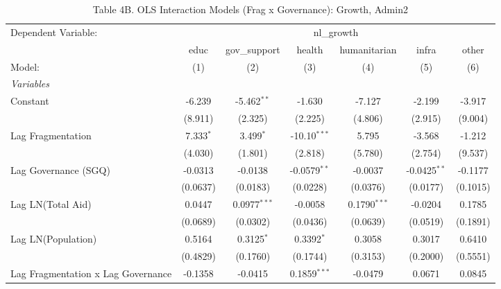 \begin{table}[H]
   \caption{Table 4B. OLS Interaction Models (Frag x Governance): Growth, Admin2}
   \centering
   \begin{tabular}{lcccccc}
      \tabularnewline \midrule \midrule
      Dependent Variable: & \multicolumn{6}{c}{nl\_growth}\\
                                         & educ        & gov\_support   & health         & humanitarian   & infra          & other \\   
      Model:                             & (1)         & (2)            & (3)            & (4)            & (5)            & (6)\\  
      \midrule
      \emph{Variables}\\
      Constant                           & -6.239      & -5.462$^{**}$  & -1.630         & -7.127         & -2.199         & -3.917\\   
                                         & (8.911)     & (2.325)        & (2.225)        & (4.806)        & (2.915)        & (9.004)\\   
      Lag Fragmentation                  & 7.333$^{*}$ & 3.499$^{*}$    & -10.10$^{***}$ & 5.795          & -3.568         & -1.212\\   
                                         & (4.030)     & (1.801)        & (2.818)        & (5.780)        & (2.754)        & (9.537)\\   
      Lag Governance (SGQ)               & -0.0313     & -0.0138        & -0.0579$^{**}$ & -0.0037        & -0.0425$^{**}$ & -0.1177\\   
                                         & (0.0637)    & (0.0183)       & (0.0228)       & (0.0376)       & (0.0177)       & (0.1015)\\   
      Lag LN(Total Aid)                  & 0.0447      & 0.0977$^{***}$ & -0.0058        & 0.1790$^{***}$ & -0.0204        & 0.1785\\   
                                         & (0.0689)    & (0.0302)       & (0.0436)       & (0.0639)       & (0.0519)       & (0.1891)\\   
      Lag LN(Population)                 & 0.5164      & 0.3125$^{*}$   & 0.3392$^{*}$   & 0.3058         & 0.3017         & 0.6410\\   
                                         & (0.4829)    & (0.1760)       & (0.1744)       & (0.3153)       & (0.2000)       & (0.5551)\\   
      Lag Fragmentation x Lag Governance & -0.1358     & -0.0415        & 0.1859$^{***}$ & -0.0479        & 0.0671         & 0.0845\\   

\end{tabular}
\end{table}
